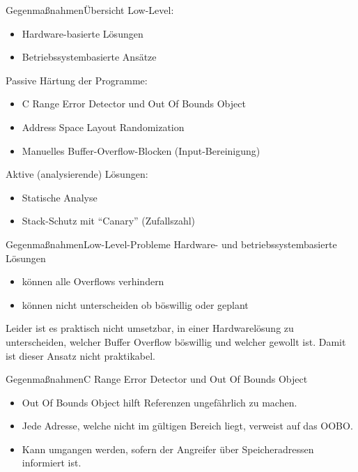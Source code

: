 \pagebreak
\begin{frame}{Gegenmaßnahmen}{Übersicht}
    Low-Level:
\begin{itemize}
    \item Hardware-basierte Lösungen
    \item Betriebssystembasierte Ansätze
\end{itemize}
Passive Härtung der Programme:
\begin{itemize}
    \item C Range Error Detector und Out Of Bounds Object
    \item Address Space Layout Randomization
    \item Manuelles Buffer-Overflow-Blocken (Input-Bereinigung)
\end{itemize}
Aktive (analysierende) Lösungen:
\begin{itemize}
    \item Statische Analyse
    \item Stack-Schutz mit ``Canary'' (Zufallszahl)
\end{itemize}
\end{frame}



\begin{frame}{Gegenmaßnahmen}{Low-Level-Probleme}
    Hardware- und betriebssystembasierte Lösungen
   \begin{itemize}
       \item können alle Overflows verhindern
       \item können nicht unterscheiden ob böswillig oder geplant
   \end{itemize}
    
    Leider ist es praktisch nicht umsetzbar, in einer Hardwarelösung
    zu unterscheiden, welcher Buffer Overflow böswillig und welcher gewollt ist. 
    Damit ist dieser Ansatz nicht praktikabel.
\end{frame}

\begin{frame}{Gegenmaßnahmen}{C Range Error Detector und Out Of Bounds Object}
    \begin{itemize}
        \item Out Of Bounds Object hilft Referenzen ungefährlich zu machen.
        \item Jede Adresse, welche nicht im gültigen Bereich liegt, verweist auf das OOBO. 
        \item Kann umgangen werden, sofern der Angreifer über Speicheradressen informiert ist. %
    \end{itemize}
\end{frame}




